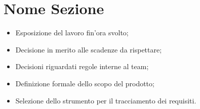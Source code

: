 \documentclass[../Riunione16-01-07.tex]{subfiles}
\begin{document}
\section{Nome Sezione}
\begin{itemize}
	\item Esposizione del lavoro fin'ora svolto;
	\item Decisione in merito alle scadenze da rispettare;
	\item Decisioni riguardati regole interne al team;
	\item Definizione formale dello scopo del prodotto;
	\item Selezione dello strumento per il tracciamento dei requisiti.
\end{itemize}
\end{document}
